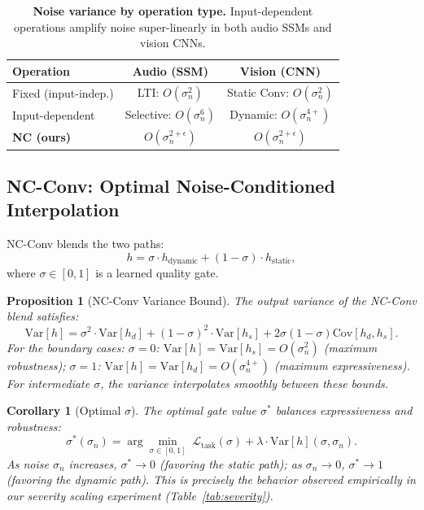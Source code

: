 \documentclass[10pt,twocolumn,letterpaper]{article}
\newtheorem{proposition}{Proposition}
\newtheorem{corollary}{Corollary}
\begin{document}
\begin{table}[t]
\centering
\caption{\textbf{Noise variance by operation type.} Input-dependent operations amplify noise super-linearly in both audio SSMs and vision CNNs.}
\label{tab:noise_parallel}
\footnotesize
\begin{tabular}{@{}lcc@{}}
\toprule
\textbf{Operation} & \textbf{Audio (SSM)} & \textbf{Vision (CNN)} \\
\midrule
Fixed (input-indep.) & LTI: $O(\sigma_n^2)$ & Static Conv: $O(\sigma_n^2)$ \\
Input-dependent & Selective: $O(\sigma_n^6)$ & Dynamic: $O(\sigma_n^{4+})$ \\
\textbf{NC (ours)} & $O(\sigma_n^{2+\epsilon})$ & $O(\sigma_n^{2+\epsilon})$ \\
\bottomrule
\end{tabular}
\end{table}

\subsection{NC-Conv: Optimal Noise-Conditioned Interpolation}

NC-Conv blends the two paths:
\begin{equation}
h = \sigma \cdot h_{\text{dynamic}} + (1 - \sigma) \cdot h_{\text{static}},
\label{eq:nc_blend}
\end{equation}
where $\sigma \in [0,1]$ is a learned quality gate.

\begin{proposition}[NC-Conv Variance Bound]
\label{prop:nc_var}
The output variance of the NC-Conv blend satisfies:
\begin{equation}
\text{Var}[h] = \sigma^2 \cdot \text{Var}[h_d] + (1{-}\sigma)^2 \cdot \text{Var}[h_s] + 2\sigma(1{-}\sigma)\text{Cov}[h_d, h_s].
\end{equation}
For the boundary cases:
$\sigma = 0$: $\text{Var}[h] = \text{Var}[h_s] = O(\sigma_n^2)$ (maximum robustness);
$\sigma = 1$: $\text{Var}[h] = \text{Var}[h_d] = O(\sigma_n^{4+})$ (maximum expressiveness).
For intermediate $\sigma$, the variance interpolates smoothly between these bounds.
\end{proposition}

\begin{corollary}[Optimal $\sigma$]
\label{cor:optimal}
The optimal gate value $\sigma^*$ balances expressiveness and robustness:
\begin{equation}
\sigma^*(\sigma_n) = \arg\min_{\sigma \in [0,1]} \; \mathcal{L}_{\text{task}}(\sigma) + \lambda \cdot \text{Var}[h](\sigma, \sigma_n).
\end{equation}
As noise $\sigma_n$ increases, $\sigma^* \to 0$ (favoring the static path); as $\sigma_n \to 0$, $\sigma^* \to 1$ (favoring the dynamic path).
This is precisely the behavior observed empirically in our severity scaling experiment (Table~\ref{tab:severity}).
\end{corollary}
\end{document}
